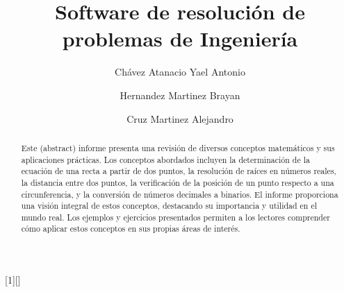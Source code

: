 \documentclass{IEEEcsmag}
\begin{document}
[1][]
{}
{}



\title{Software de resolución de problemas de Ingeniería }

\author{Chávez Atanacio Yael Antonio}

\author{Hernandez Martinez Brayan}

\author{Cruz Martinez Alejandro}



\begin{abstract}
Este (abstract) informe presenta una revisión de diversos conceptos matemáticos y sus aplicaciones prácticas. Los conceptos abordados incluyen la determinación de la ecuación de una recta a partir de dos puntos, la resolución de raíces en números reales, la distancia entre dos puntos, la verificación de la posición de un punto respecto a una circunferencia, y la conversión de números decimales a binarios.
El informe proporciona una visión integral de estos conceptos, destacando su importancia y utilidad en el mundo real. Los ejemplos y ejercicios presentados permiten a los lectores comprender cómo aplicar estos conceptos en sus propias áreas de interés.
\end{abstract}
\end{document}
